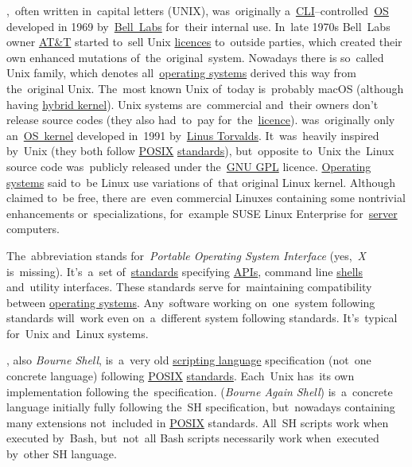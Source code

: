 \label{linux}

\label{unixlinux}
\begin{itemize}
    ,~often written in~capital letters (UNIX), was~originally a~\hyperref[shellcligui]{CLI}--controlled~\hyperref[os]{OS} developed in 1969 by~\href{https://en.wikipedia.org/wiki/Bell_Labs}{Bell~Labs} for~their internal use.
            In~late 1970s Bell~Labs owner \href{https://en.wikipedia.org/wiki/AT\%26T}{AT\&T} started to~sell Unix \hyperref[licencing]{licences} to~outside parties, which created their own enhanced mutations of~the~original~system.
            Nowadays there is so~called Unix family, which denotes all~\hyperref[os]{operating systems} derived this way from the~original Unix.
            The~most known Unix of~today is~probably macOS (although having \hyperref[hybridkernel]{hybrid kernel}).
            \warningnonl Unix systems are~commercial and~their owners don't release source codes (they also had~to~pay for~the~\hyperref[licencing]{licence}).
     was~originally only an~\hyperref[kernel]{OS~kernel} developed in~1991 by~\href{https://en.wikipedia.org/wiki/Linus_Torvalds}{Linus Torvalds}.
            It~was~heavily inspired by~Unix (they both follow \hyperref[posix]{POSIX} \hyperref[protocolstandard]{standards}), but~opposite to~Unix the~Linux source code was~publicly released under the~\hyperref[gpl]{GNU GPL} licence.
            \hyperref[os]{Operating systems} said to~be Linux use variations of~that original Linux kernel.
            Although claimed to~be free, there are~even commercial Linuxes containing some nontrivial enhancements or~specializations, for~example SUSE Linux Enterprise for~\hyperref[server]{server} computers.
\end{itemize}

\label{posix}
The~abbreviation stands for~\textit{Portable Operating System Interface} (yes,~\textit{X} is~missing).
It's~a~set of~\hyperref[protocolstandard]{standards} specifying \hyperref[api]{APIs}, command line \hyperref[shellcligui]{shells} and~utility interfaces.
These standards serve for~maintaining compatibility between \hyperref[os]{operating systems}.
Any~software working on~one~system following standards will~work even on~a~different system following standards.
It's~typical for~Unix and~Linux systems.
\newpage

\label{shbash}
\begin{itemize}
    , also \textit{Bourne Shell}, is~a~very old \hyperref[scriptinglanguages]{scripting language} specification (not~one concrete language) following \hyperref[posix]{POSIX} \hyperref[protocolstandard]{standards}.
            Each~Unix has~its own implementation following the~specification.
     (\textit{Bourne Again Shell}) is~a~concrete language initially fully following the~SH specification, but~nowadays containing many extensions not~included in \hyperref[posix]{POSIX} standards.
            All~SH scripts work when executed by~Bash, but~not~all Bash scripts necessarily work when~executed by~other SH language.
\end{itemize}

